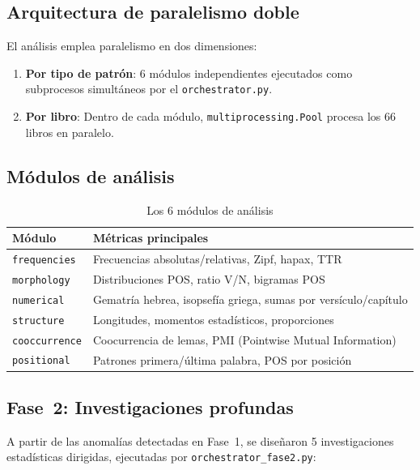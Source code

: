 \documentclass[12pt,a4paper]{article}
\begin{document}
\subsection{Arquitectura de paralelismo doble}

El an\'alisis emplea paralelismo en dos dimensiones:

\begin{enumerate}[leftmargin=2em]
\item \textbf{Por tipo de patr\'on}: 6 m\'odulos independientes ejecutados como subprocesos
      simult\'aneos por el \texttt{orchestrator.py}.
\item \textbf{Por libro}: Dentro de cada m\'odulo, \texttt{multiprocessing.Pool} procesa
      los 66 libros en paralelo.
\end{enumerate}

\subsection{M\'odulos de an\'alisis}

\begin{table}[H]
\centering
\caption{Los 6 m\'odulos de an\'alisis}
\begin{tabular}{lp{9cm}}
\toprule
\textbf{M\'odulo} & \textbf{M\'etricas principales} \\
\midrule
\texttt{frequencies}   & Frecuencias absolutas/relativas, Zipf, hapax, TTR \\
\texttt{morphology}    & Distribuciones POS, ratio V/N, bigramas POS \\
\texttt{numerical}     & Gematr\'ia hebrea, isopsef\'ia griega, sumas por vers\'iculo/cap\'itulo \\
\texttt{structure}     & Longitudes, momentos estad\'isticos, proporciones \\
\texttt{cooccurrence}  & Coocurrencia de lemas, PMI (Pointwise Mutual Information) \\
\texttt{positional}    & Patrones primera/\'ultima palabra, POS por posici\'on \\
\bottomrule
\end{tabular}
\end{table}

\subsection{Fase~2: Investigaciones profundas}

A partir de las anomal\'ias detectadas en Fase~1, se dise\~naron 5 investigaciones estad\'isticas
dirigidas, ejecutadas por \texttt{orchestrator\_fase2.py}:
\end{document}
